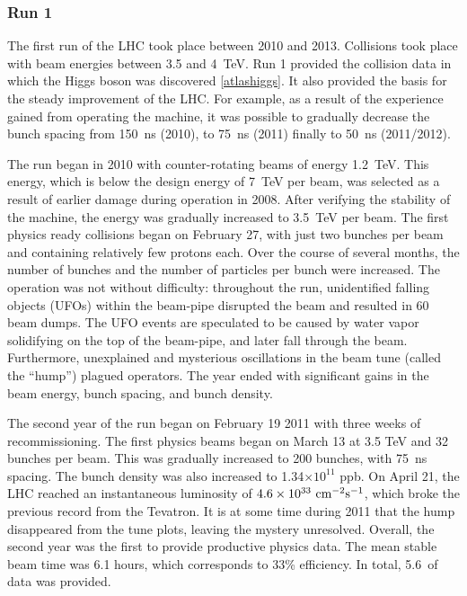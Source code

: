 \newpage

\subsubsection{Run 1}

The first run of the LHC took place between 2010 and 2013.
Collisions took place with beam energies between 3.5 and 4~TeV.\cite{lhcRun1}
Run 1 provided the collision data in which the Higgs boson was discovered \ref{atlashiggs}.
It also provided the basis for the steady improvement of the LHC.
For example, as a result of the experience gained from operating the machine, it was possible to gradually decrease the bunch spacing from 150~ns (2010), to 75~ns (2011) finally to 50~ns (2011/2012). \cite{lhcRun1}

The run began in 2010 with counter-rotating beams of energy 1.2~TeV.
This energy, which is below the design energy of 7~TeV per beam, was selected as a result of earlier damage during operation in 2008.
After verifying the stability of the machine, the energy was gradually increased to 3.5~TeV per beam.
The first physics ready collisions began on February 27, with just two bunches per beam and containing relatively few protons each.
Over the course of several months, the number of bunches and the number of particles per bunch were increased.
The operation was not without difficulty: throughout the run, unidentified falling objects (UFOs) within the beam-pipe disrupted the beam and resulted in 60 beam dumps.
The UFO events are speculated to be caused by water vapor solidifying on the top of the beam-pipe, and later fall through the beam.
Furthermore, unexplained and mysterious oscillations in the beam tune (called the ``hump'') plagued operators. \cite{lhcRun1}
The year ended with significant gains in the beam energy, bunch spacing, and bunch density.

The second year of the run began on February 19 2011 with three weeks of recommissioning.
The first physics beams began on March 13 at 3.5 TeV and 32 bunches per beam.
This was gradually increased to 200 bunches, with 75~ns spacing.
The bunch density was also increased to 1.34$\times10^{11}$ ppb.
On April 21, the LHC reached an instantaneous luminosity of $4.6\times10^{33}~\text{cm}^{-2}\text{s}^{-1}$, which broke the previous record from the Tevatron.
It is at some time during 2011 that the hump disappeared from the tune plots, leaving the mystery unresolved.
Overall, the second year was the first to provide productive physics data. The mean stable beam time was 6.1 hours, which corresponds to 33\% efficiency.
In total, 5.6~\fb of data was provided. \cite{lhcRun1}

